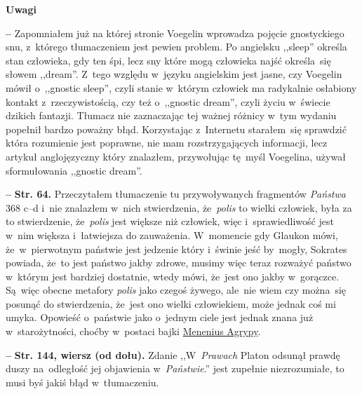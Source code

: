 \documentclass[a4paper,11pt]{article}
\newcommand{\tb}{\textbf}
\newcommand{\noi}{\noindent}
\newcommand{\start}{\noi \tb{--} {}}
\newcommand{\Center}[1]{\begin{center} #1 \end{center}}
\newcommand{\CenterTB}[1]{\Center{\tb{#1}}}
\newcommand{\Str}[1]{\tb{Str. #1.}}
\newcommand{\StrWd}[2]{\tb{Str. #1, wiersz #2 (od dołu).}}
\begin{document}
\CenterTB{Uwagi}

\start Zapomniałem już na której stronie Voegelin wprowadza pojęcie
gnostyckiego snu, z~którego tłumaczeniem jest pewien problem. Po
angielsku ,,sleep'' określa stan człowieka, gdy ten śpi, lecz sny
które mogą człowieka najść określa~się słowem ,,dream''. Z~tego
względu w~języku angielskim jest jasne, czy Voegelin mówił o~,,gnostic
sleep'', czyli stanie w~którym człowiek ma radykalnie osłabiony
kontakt z~rzeczywistością, czy też o~,,gnostic dream'', czyli życiu
w~świecie dzikich fantazji. Tłumacz nie zaznaczając tej ważnej różnicy
w~tym wydaniu popełnił bardzo poważny błąd. Korzystając z~Internetu
starałem~się sprawdzić która rozumienie jest poprawne, nie mam
rozstrzygających informacji, lecz artykuł anglojęzyczny który
znalazłem, przywołując tę~myśl Voegelina, używał sformułowania
,,gnostic dream''.

\start \Str{64} Przeczytałem tłumaczenie tu przywoływanych fragmentów
\emph{Państwa} 368 c--d i~nie znalazłem w~nich stwierdzenia,
że~\emph{polis} to wielki człowiek, była za to stwierdzenie,
że~\emph{polis} jest większe niż człowiek, więc i~sprawiedliwość jest
w~nim większa i~łatwiejsza do zauważenia. W~momencie gdy Glaukon mówi,
że~w~pierwotnym państwie jest jedzenie który i~świnie jeść by~mogły,
Sokrates powiada, że~to jest państwo jakby zdrowe, musimy więc teraz
rozważyć państwo w~którym jest bardziej dostatnie, wtedy mówi, że~jest
ono jakby w~gorączce. Są~więc obecne metafory \emph{polis} jako czegoś
żywego, ale~nie wiem czy można~się posunąć do stwierdzenia, że~jest
ono wielki człowiekiem, może jednak coś mi umyka. Opowieść o~państwie
jako o~jednym ciele jest jednak znana już w~starożytności, choćby
w~postaci bajki
\href{https://en.wikipedia.org/wiki/Agrippa_Menenius_Lanatus_(consul_503_BC)}
{Menenius Agrypy}.

\start \StrWd{144}{} Zdanie ,,W~\emph{Prawach} Platon odsunął prawdę
duszy na~odległość jej objawienia w~\emph{Państwie}.'' jest zupełnie
niezrozumiałe, to musi byś jakiś błąd w~tłumaczeniu.
\end{document}
